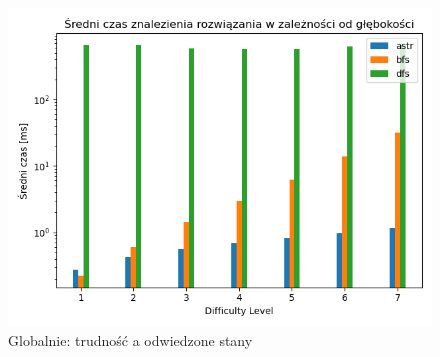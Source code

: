 \documentclass{classrep}
\begin{document}
\begin{figure}[p] \centering
 \includegraphics[width=0.9\linewidth]{./pic/glob_time_vs_diff.png}
 \caption{Globalnie: trudność a odwiedzone stany}
\end{figure}
\end{document}
